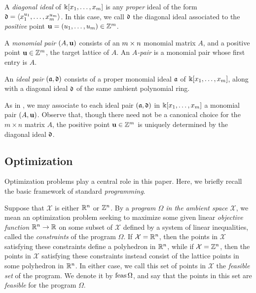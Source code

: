 \documentclass[11pt]{amsart}
\begin{document}
\begin{definition}  A  \emph{diagonal ideal} of $\Bbbk[x_1, \ldots, x_{m}]$ is any \emph{proper} ideal of the form $\mathfrak{d} = \langle x_1^{u_1}, \ldots, x_{m}^{u_{m}} \rangle$.  In this case,  we call $\mathfrak{d}$ the diagonal ideal associated to the \emph{positive} point $\mathbf{u} = (u_1, \ldots, u_{m}) \in \mathbb{Z}^{m}$.
\end{definition}

\begin{definition}[Pairs]  
\label{pairs: D}
   A \emph{monomial pair} $(A, \mathbf{u})$ consists of an $m \times n$ monomial matrix $A$, and a positive point $\mathbf{u} \in \mathbb{Z}^m$, the target lattice of $A$.  
   An \emph{$A$-pair} is a monomial pair whose first entry is $A$.
   
   An \emph{ideal pair} $(\mathfrak{a}, \mathfrak{d})$ consists of a proper monomial ideal $\mathfrak{a}$ of $\Bbbk[x_1, \ldots, x_{m}]$, along with a diagonal ideal $\mathfrak{d}$ of the same ambient polynomial ring.
\end{definition}

\begin{remark}
\label{associate of pairs: R}
 As in , we may associate to each ideal pair $(\mathfrak{a}, \mathfrak{d})$ in $\Bbbk[x_1, \ldots, x_{m}]$ a monomial pair $(A, \mathbf{u})$.  Observe that, though there need not be a canonical choice for the $m \times n$ matrix $A$, the positive point $\mathbf{u} \in \mathbb{Z}^m$ is uniquely determined by the diagonal ideal $\mathfrak{d}$.
\end{remark}

\subsection{Optimization} \label{optimization: S}  Optimization problems play a central role in this paper.  Here, we briefly recall the basic framework of standard \emph{programming}.

Suppose that $\mathcal{X}$ is either $\mathbb{R}^n$ or $\mathbb{Z}^n$.  By a \emph{program $\Omega$ in the ambient space $\mathcal{X}$}, we mean an optimization problem seeking to maximize some given linear \emph{objective function} $\mathbb{R}^n \to \mathbb{R}$ on some subset of $\mathcal{X}$ defined by a system of linear inequalities, called the \emph{constraints} of the program $\Omega$. If $\mathcal{X} = \mathbb{R}^n$, then the points in $\mathcal{X}$ satisfying these constraints define a polyhedron in $\mathbb{R}^n$, while if $\mathcal{X} = \mathbb{Z}^n$, then the points in $\mathcal{X}$ satisfying these constraints instead consist of the lattice points in some polyhedron in $\mathbb{R}^n$.  In either case, we call this set of points in $\mathcal{X}$ the \emph{feasible set} of the program.  We denote it by $\operatorname{feas} \Omega$, and say that the points in this set are \emph{feasible} for the program $\Omega$.
\end{document}
